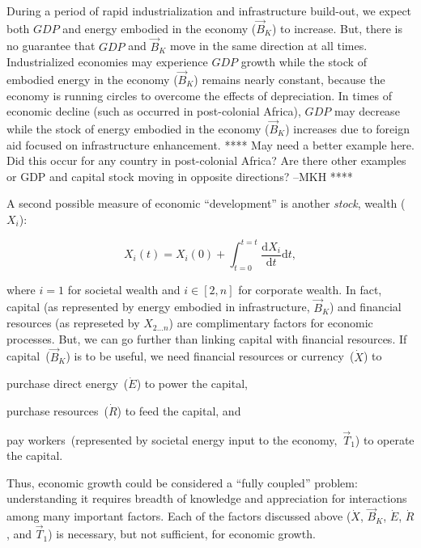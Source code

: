 During a period of rapid industrialization and infrastructure build-out, 
we expect both $GDP$ and energy embodied in the economy ($\vec{B}_{K}$)
to increase.
But, there is no guarantee that $GDP$ and $\vec{B}_{K}$ move 
in the same direction at all times.
Industrialized economies may experience $GDP$ growth while 
the stock of embodied energy in the economy ($\vec{B}_{K}$) remains nearly constant,
because the economy is running circles to overcome the effects of depreciation.
In times of economic decline (such as occurred in post-colonial Africa),
$GDP$ may decrease 
while the stock of energy embodied in the economy ($\vec{B}_{K}$) increases 
due to foreign aid focused on infrastructure enhancement.
**** May need a better example here.
Did this occur for any country in post-colonial Africa? 
Are there other examples or GDP and capital stock 
moving in opposite directions? --MKH ****

A second possible measure of economic ``development'' is another \emph{stock}, 
wealth ($X_{i}$):

\begin{equation} \label{eq:Dev_Integral_Wealth}
	X_{i}(t) 
	= X_{i}(0) 
	+ \int_{t=0}^{t=t} \frac{\mathrm{d}X_{i}}{\mathrm{d}t}\mathrm{d}t,
\end{equation}

\noindent{}where $i=1$ for societal wealth 
and $i \in [2,n]$ for corporate wealth.
In fact, capital (as represented by energy embodied in infrastructure, $\vec{B}_{K}$) and 
financial resources (as represeted by $X_{2 \ldots n}$) 
are complimentary factors for economic processes. 
But, we can go further than linking capital with financial resources.
If capital~($\vec{B}_{K}$) is to be useful, we need financial resources
or currency~($\dot{X}$) to 
\begin{itemize}
	\item{purchase direct energy~($\dot{E}$) to power the capital,
	\item{purchase resources~($\dot{R}$) to feed the capital, and}
	\item{pay workers~(represented 
	by societal energy input to the economy,~$\vec{T}_{1}$) 
	to operate the capital.}
} 
\end{itemize}

Thus, economic growth could be considered a ``fully coupled'' problem:
understanding it requires breadth of knowledge and appreciation for 
interactions among many important factors.
Each of the factors discussed above 
($\dot{X}$, $\vec{B}_{K}$, $\dot{E}$, $\dot{R}$, and $\vec{T}_{1}$)
is necessary, but not sufficient, for economic growth.

